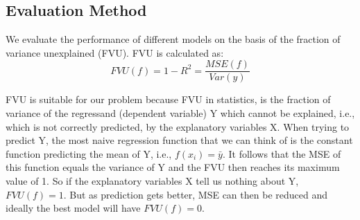 \subsection{Evaluation Method}
We evaluate the performance of different models on the basis of the fraction of variance unexplained (FVU). FVU is calculated as:
\[FVU(f) =1-R^2 = \frac{MSE(f)}{Var(y)}\]
\par FVU is suitable for our problem because FVU in statistics, is the fraction of variance of the regressand (dependent variable) Y which cannot be explained, i.e., which is not correctly predicted, by the explanatory variables X. When trying to predict Y, the most naive regression function that we can think of is the constant function predicting the mean of Y, i.e., $f(x_{i})=\bar{y}$. It follows that the MSE of this function equals the variance of Y and the FVU then reaches its maximum value of 1. So if the explanatory variables X tell us nothing about Y, $FVU(f)=1$. But as prediction gets better, MSE can then be reduced and ideally the best model will have $FVU(f) = 0$. 

